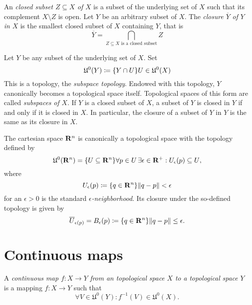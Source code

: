 An \emph{closed subset $Z \subseteq X$ of $X$} is a subset of the underlying
set of $X$ such that its complement $X \setminus Z$ is open. Let $Y$ be an
arbitrary subset of $X$. The \emph{closure $\overline Y$ of $Y$ in $X$} is the
smallest closed subset of $X$ containing $Y$, that is
\begin{equation}
  \overline Y = \bigcap_{\text{$Z \subseteq X$ is a closed subset}} Z
\end{equation}

Let $Y$ be any subset of the underlying set of $X$. Set
\[
  \mathfrak U^0(Y) \coloneqq \lbrace Y \cap U\rbrace{U \in \mathfrak U^0(X)}
\]
This is a topology, the \emph{subspace topology}. Endowed with this topology,
$Y$ canonically becomes a topological space itself. Topological spaces of this form
are called \emph{subspaces of $X$}. If $Y$ is a closed subset of $X$, a subset of
$Y$ is closed in $Y$ if and only if it is closed in $X$. In particular, the closure
of a subset of $Y$ in $Y$ is the same as its closure in $X$.

The cartesian space $\mathbf{R}^n$ is canonically a topological space with the
topology defined by
\begin{equation}
  \label{eq:cartesian_topology}
  \mathfrak U^0(\mathbf{R}^n) = \lbrace U \subseteq \mathbf{R}^n\rbrace{\forall p \in U \,
  \exists \epsilon \in \mathbf{R}^+: U_\epsilon(p) \subseteq U},
\end{equation}
where
\begin{equation}
  U_\epsilon(p) \coloneqq \lbrace q \in \mathbf{R}^n\rbrace{\lVert q - p\rVert < \epsilon}
\end{equation}
for an $\epsilon > 0$ is the standard \emph{$\epsilon$-neighborhood}. Its 
closure under the so-defined topology is given by
\begin{equation}
  \overline U_{\epsilon(p)} = B_\epsilon(p) \coloneqq
  \lbrace q \in \mathbf{R}^n\rbrace{\lVert q - p\rVert \leq \epsilon}.
\end{equation}

\section{Continuous maps}

\begin{dfn}
  A \emph{continuous map $f\colon X \to Y$ from an topological space $X$ to
  a topological space $Y$} is a mapping $f\colon X \to Y$ such that
  \[
    \forall V \in \mathfrak U^0(Y) : f^{-1}(V) \in \mathfrak U^0(X).
  \]
\end{dfn}

